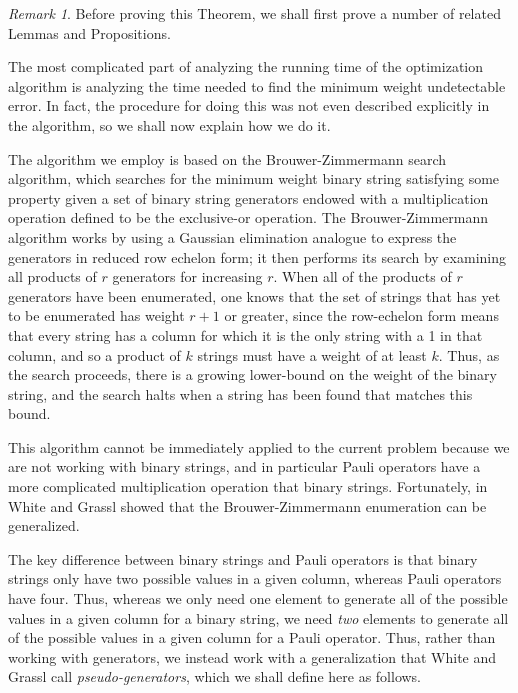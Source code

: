 \documentclass[12pt]{amsbook}
\theoremstyle{plain}
\theoremstyle{definition}
\theoremstyle{remark}
\newtheorem{remark}{Remark}
\begin{document}
\begin{remark}
Before proving this Theorem, we shall first prove a number of related Lemmas and Propositions.

The most complicated part of analyzing the running time of the optimization algorithm is analyzing the time needed to find the minimum weight undetectable error.  In fact, the procedure for doing this was not even described explicitly in the algorithm, so we shall now explain how we do it.

The algorithm we employ is based on the Brouwer-Zimmermann search algorithm, which searches for the minimum weight binary string satisfying some property given a set of binary string generators endowed with a multiplication operation defined to be the exclusive-or operation.  The Brouwer-Zimmermann algorithm works by using a Gaussian elimination analogue to express the generators in reduced row echelon form;  it then performs its search by examining all products of $r$ generators for increasing $r$.  When all of the products of $r$ generators have been enumerated, one knows that the set of strings that has yet to be enumerated has weight $r+1$ or greater, since the row-echelon form means that every string has a column for which it is the only string with a 1 in that column, and so a product of $k$ strings must have a weight of at least $k$.  Thus, as the search proceeds, there is a growing lower-bound on the weight of the binary string, and the search halts when a string has been found that matches this bound.

This algorithm cannot be immediately applied to the current problem because we are not working with binary strings, and in particular Pauli operators have a more complicated multiplication operation that binary strings.  Fortunately, in~\cite{White:2006fj} White and Grassl showed that the Brouwer-Zimmermann enumeration can be generalized.

The key difference between binary strings and Pauli operators is that binary strings only have two possible values in a given column, whereas Pauli operators have four.  Thus, whereas we only need one element to generate all of the possible values in a given column for a binary string, we need \emph{two} elements to generate all of the possible values in a given column for a Pauli operator.  Thus, rather than working with generators, we instead work with a generalization that White and Grassl call \emph{pseudo-generators}, which we shall define here as follows.
\end{remark}
\end{document}
